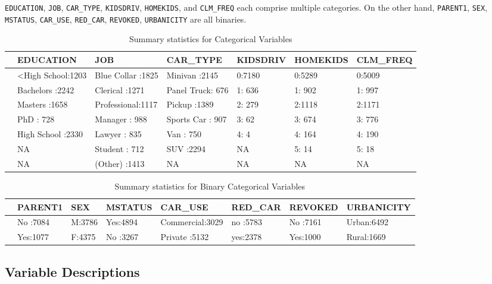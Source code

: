 \documentclass[]{article}
\begin{document}
\texttt{EDUCATION}, \texttt{JOB}, \texttt{CAR\_TYPE}, \texttt{KIDSDRIV},
\texttt{HOMEKIDS}, and \texttt{CLM\_FREQ} each comprise multiple
categories. On the other hand, \texttt{PARENT1}, \texttt{SEX},
\texttt{MSTATUS}, \texttt{CAR\_USE}, \texttt{RED\_CAR},
\texttt{REVOKED}, \texttt{URBANICITY} are all binaries.

\begin{table}

\caption{\label{tab:t3}Summary statistics for Categorical Variables}
\centering
\begin{tabular}[t]{l|l|l|l|l|l|l}
\hline
  &        EDUCATION &           JOB &        CAR\_TYPE & KIDSDRIV & HOMEKIDS & CLM\_FREQ\\
\hline
 & <High School:1203 & Blue Collar :1825 & Minivan    :2145 & 0:7180 & 0:5289 & 0:5009\\
\hline
 & Bachelors   :2242 & Clerical    :1271 & Panel Truck: 676 & 1: 636 & 1: 902 & 1: 997\\
\hline
 & Masters     :1658 & Professional:1117 & Pickup     :1389 & 2: 279 & 2:1118 & 2:1171\\
\hline
 & PhD         : 728 & Manager     : 988 & Sports Car : 907 & 3:  62 & 3: 674 & 3: 776\\
\hline
 & High School :2330 & Lawyer      : 835 & Van        : 750 & 4:   4 & 4: 164 & 4: 190\\
\hline
 & NA & Student     : 712 & SUV        :2294 & NA & 5:  14 & 5:  18\\
\hline
 & NA & (Other)     :1413 & NA & NA & NA & NA\\
\hline
\end{tabular}
\end{table}

\begin{table}

\caption{\label{tab:t4}Summary statistics for Binary Categorical Variables}
\centering
\begin{tabular}[t]{l|l|l|l|l|l|l|l}
\hline
  & PARENT1 & SEX & MSTATUS &       CAR\_USE & RED\_CAR & REVOKED & URBANICITY\\
\hline
 & No :7084 & M:3786 & Yes:4894 & Commercial:3029 & no :5783 & No :7161 & Urban:6492\\
\hline
 & Yes:1077 & F:4375 & No :3267 & Private   :5132 & yes:2378 & Yes:1000 & Rural:1669\\
\hline
\end{tabular}
\end{table}

\subsection{Variable Descriptions}\label{variable-descriptions}
\end{document}
